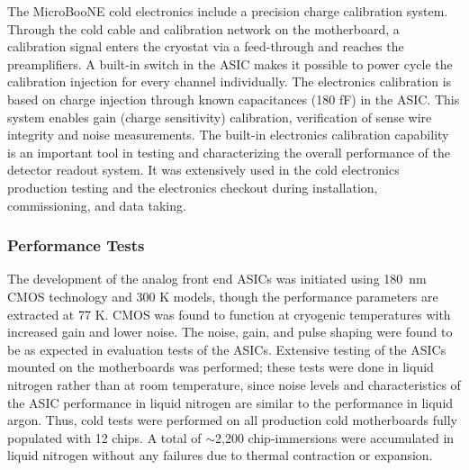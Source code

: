 The MicroBooNE cold electronics include a precision charge calibration system. Through the cold cable and calibration network on the motherboard, a calibration signal enters the cryostat via a feed-through and reaches the preamplifiers. A built-in switch in the ASIC makes it possible to power cycle the calibration injection for every channel individually. The electronics calibration is based on charge injection through known capacitances (180 fF) in the ASIC. This system enables gain (charge sensitivity) calibration, verification of sense wire integrity and noise measurements. The built-in electronics calibration capability is an important tool in testing and characterizing the overall performance of the detector readout system. It was extensively used in the cold electronics production testing and the electronics checkout during installation, commissioning, and data taking.
 
\subsubsection{Performance Tests}

The development of the analog front end ASICs was initiated using 180~nm CMOS technology and 300 K models, though the performance parameters are extracted at 77 K. CMOS was found to function at cryogenic temperatures with increased gain and lower noise. The noise, gain, and pulse shaping were found to be as expected in evaluation tests of the ASICs. Extensive testing of the ASICs mounted on the motherboards was performed; these tests were done in liquid nitrogen rather than at room temperature, since noise levels and characteristics of the ASIC performance in liquid nitrogen are similar to the performance in liquid argon.  Thus, cold tests were performed on all production cold motherboards fully populated with 12 chips. A total of $\sim$2,200 chip-immersions were accumulated in liquid nitrogen without any failures due to thermal contraction or expansion. 

